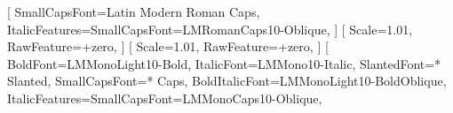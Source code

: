 \usepackage{lmodern}%
%
\usepackage{fontspec}%
\usepackage[warnings-off={mathtools-colon,mathtools-overbracket},math-style=ISO,bold-style=ISO]{unicode-math}%
\newcommand{\DenKrFontEngine}{fontspec}%
\setmainfont{Latin Modern Roman}[%
	SmallCapsFont={Latin Modern Roman Caps},%
	ItalicFeatures={SmallCapsFont=LMRomanCaps10-Oblique},%
]%
\setmainfont{LinuxLibertine O}[%
	Scale=1.01,%
	RawFeature={+zero},%
]%
\setsansfont{Linux Biolinum O}[%
	Scale=1.01,%
	RawFeature={+zero},%
]%
\setmonofont{Latin Modern Mono}[%
	BoldFont={LMMonoLight10-Bold},%
	ItalicFont={LMMono10-Italic},%
	SlantedFont={* Slanted},%
	SmallCapsFont={* Caps},%
	BoldItalicFont={LMMonoLight10-BoldOblique},%
	ItalicFeatures={SmallCapsFont=LMMonoCaps10-Oblique},%
